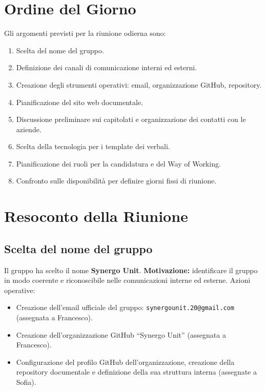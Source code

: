 \section{Ordine del Giorno}
Gli argomenti previsti per la riunione odierna sono:
\begin{enumerate}
    \item Scelta del nome del gruppo.
    \item Definizione dei canali di comunicazione interni ed esterni.
    \item Creazione degli strumenti operativi: email, organizzazione GitHub, repository.
    \item Pianificazione del sito web documentale.
    \item Discussione preliminare sui capitolati e organizzazione dei contatti con le aziende.
    \item Scelta della tecnologia per i template dei verbali.
    \item Pianificazione dei ruoli per la candidatura e del Way of Working.
    \item Confronto sulle disponibilità per definire giorni fissi di riunione.
\end{enumerate}

\section{Resoconto della Riunione}

\subsection{Scelta del nome del gruppo}
Il gruppo ha scelto il nome \textbf{Synergo Unit}.  
\textbf{Motivazione:} identificare il gruppo in modo coerente e riconoscibile nelle comunicazioni interne ed esterne.  
Azioni operative:
\begin{itemize}
    \item Creazione dell’email ufficiale del gruppo: \texttt{synergounit.20@gmail.com} (assegnata a Francesco).
    \item Creazione dell’organizzazione GitHub “Synergo Unit” (assegnata a Francesco).
    \item Configurazione del profilo GitHub dell’organizzazione, creazione della repository documentale e definizione della sua struttura interna (assegnate a Sofia).
\end{itemize}

